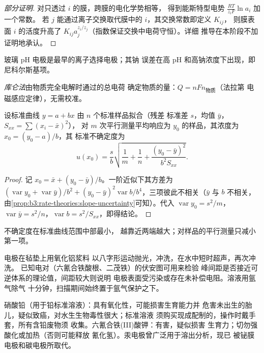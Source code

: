 \begin{proof}[部分证明]
对只透过 $i$ 的膜，跨膜的电化学势相等，
得到能斯特型电势 $\frac{RT}{z_iF}\ln a_i$ 加一个常数。
若 $j$ 能通过离子交换取代膜中的 $i$，其交换常数即定义 $K_{ij}$，
则膜表面 $i$ 的活度升高了
$K_{ij}a_j^{z_i/z_j}$（指数保证交换中电荷守恒）。详细
推导在本阶段不加证明地承认。
\end{proof}

玻璃 pH 电极是最早的离子选择电极；其钠
误差在高 pH 和高钠浓度下出现，即尼科尔斯基项。

\begin{definition}[库仑法]\label{def:b3:electrode-kinetics:coulometry}
\emph{库仑法}由物质完全电解时通过的总电荷
确定物质的量：$Q = nFn_{\text{物质}}$（法拉第
电磁感应定律），无需校准。
\end{definition}

\begin{proposition}[由标准曲线读取浓度的不确定度]\label{prop:b3:electrode-kinetics:inverse-prediction}
设标准曲线 $y = a + bx$ 由 $n$ 个标准样品拟合（残差
标准差 $s$，均值 $\bar y$，$S_{xx} = \sum(x_i - \bar x)^2$），
对 $m$ 次平行测量平均响应为 $y_0$ 的样品，其浓度为 $x_0 = (y_0 - a)/b$，其
标准不确定度为
\[
  u(x_0) = \frac{s}{b}\sqrt{\frac1m + \frac1n + \frac{(y_0 - \bar y)^2}{b^2S_{xx}}} .
\]
\end{proposition}

\begin{proof}
记 $x_0 = \bar x + (y_0 - \bar y)/b$。一阶近似下其方差为 $(\operatorname{var}y_0 +
\operatorname{var}\bar y)/b^2 + (y_0 - \bar y)^2\operatorname{var}b/b^4$，三项彼此不相关（$\bar y$ 与 $b$
不相关，由\cref{prop:b3:rate-theories:slope-uncertainty}可知）。代入 $\operatorname{var}y_0 =
s^2/m$，$\operatorname{var}\bar y = s^2/n$，$\operatorname{var}b = s^2/S_{xx}$，即得结论。
\end{proof}

不确定度在标准曲线范围中部最小，
越靠近两端越大；对样品的平行测量只减小第一项。

\begin{inthelab}[制备玻璃碳电极]
电极在毡垫上用氧化铝浆料
以八字形运动抛光，冲洗，在水中短时超声，再次冲洗。
已知电对（六氰合铁酸根、二茂铁）的伏安图可用来检验
峰间距是否接近可逆体系的理论值，间距较大则说明
电极表面受污染或存在未补偿电阻。溶液用氩气除气
十分钟，扫描期间始终置于氩气保护之下。
\end{inthelab}

\begin{safety}{}
硝酸铅（用于铅标准溶液）：具有氧化性，可能损害生育能力并
危害未出生的胎儿，疑似致癌，对水生生物毒性很大；标准溶液
须购买现成配制的，操作时戴手套，所有含铅废物须
收集。六氰合铁(III)酸钾：有害，疑似损害
生育力；切勿强酸化或加热（否则可能释放
氰化氢）。汞电极曾广泛用于溶出分析，现已
被铋膜电极和碳电极所取代。
\end{safety}

